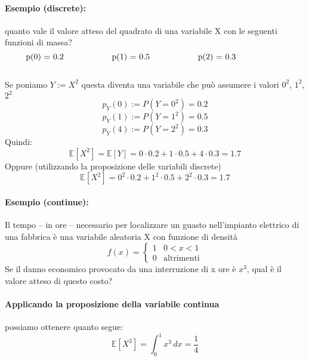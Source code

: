 \documentclass[]{article}
\newcommand{\ev}{\mathbb{E}[X]}
\renewcommand{\ev}[1]{\mathbb{E}[#1]}
\begin{document}
    \paragraph{Esempio (discrete):} quanto vale il valore atteso del quadrato di una variabile X con le seguenti funzioni di massa?
    \begin{equation*}
        \begin{minipage}{0.3\textwidth}
            p(0) = 0.2
        \end{minipage}
        \begin{minipage}{0.3\textwidth}
            p(1) = 0.5
        \end{minipage}
        \begin{minipage}{0.3\textwidth}
            p(2) = 0.3
        \end{minipage}
    \end{equation*} \\
    Se poniamo $Y := X^2$ questa diventa una variabile che può assumere i valori $0^2$, $1^2$, $2^2$
    \[ p_Y(0) := P(Y = 0^2) = 0.2 \]
    \[ p_Y(1) := P(Y = 1^2) = 0.5 \]
    \[ p_Y(4) := P(Y = 2^2) = 0.3 \]
    Quindi:
    \[ \ev{X^2} = \ev{Y} = 0 \cdot 0.2 + 1 \cdot 0.5 + 4 \cdot 0.3 = 1.7 \]
    Oppure (utilizzando la proposizione delle variabili discrete)
    \[ \ev{X^2} = 0^2 \cdot 0.2 + 1^2 \cdot 0.5 + 2^2 \cdot 0.3 = 1.7\]
    \paragraph{Esempio (continue):} Il tempo – in ore – necessario per localizzare un guasto nell’impianto
    elettrico di una fabbrica è una variabile aleatoria X con funzione di densità
    \begin{equation*}
        f(x) =
        \begin{cases}
            1 & 0 < x < 1 \\
            0 & \text{altrimenti}
        \end{cases}
    \end{equation*}
    Se il danno economico provocato da una interruzione di x ore è $x^3$, qual è il valore
    atteso di questo costo? \\
    \paragraph{Applicando la proposizione della variabile continua} possiamo ottenere quanto segue:
    \[ \ev{X^3} = \int_{0}^{1} x^3 \, dx = \frac{1}{4} \]
\end{document}
